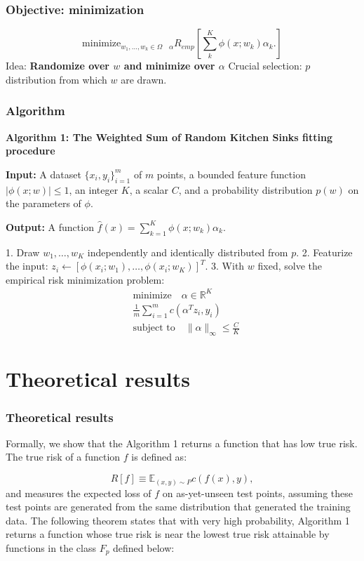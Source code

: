 \begin{frame}
  \frametitle{Objective: minimization}

  \begin{equation}
    \text{minimize}_{w_1, \ldots, w_k \in \Omega \quad \alpha}
    R_{emp}\left[
      \sum_k^K \phi(x; w_k) \alpha_k. 
    \right]
  \end{equation}
  Idea: \textbf{Randomize over $w$ and minimize over $\alpha$}
  Crucial selection: $p$ distribution from which $w$ are drawn.

\end{frame}

\begin{frame}
  \frametitle{Algorithm}
  \textbf{Algorithm 1: The Weighted Sum of Random Kitchen Sinks fitting procedure}

  \textbf{Input:}
  A dataset $\{x_i, y_i\}_{i=1}^m$ of $m$ points,
  a bounded feature function $|\phi(x; w)| \leq 1$,
  an integer $K$,
  a scalar $C$,
  and a probability distribution $p(w)$ on the parameters of $\phi$.
  
  \textbf{Output:}
  A function $\hat{f}(x) = \sum_{k=1}^K \phi(x; w_k)\alpha_k$.
  
  1. Draw $w_1, \ldots, w_K$ independently and identically distributed from $p$.
  2. Featurize the input: $z_i \leftarrow [\phi(x_i; w_1), \ldots, \phi(x_i; w_K)]^T$.
  3. With $w$ fixed, solve the empirical risk minimization problem:
  \[
  \begin{aligned}
  &\text{minimize} \quad \alpha \in \mathbb{R}^K \\
  &\frac{1}{m} \sum_{i=1}^m c(\alpha^T z_i, y_i) \\
  &\text{subject to} \quad \|\alpha\|_{\infty} \leq \frac{C}{K}
  \end{aligned}
  \]
  

\end{frame}

\section{Theoretical results}
\begin{frame}
  \frametitle{Theoretical results}
  Formally, we show that the Algorithm 1 returns a function that has low true risk. The true risk of a function $f$ is defined as:
  
  \begin{equation}
    R[f] \equiv \mathbb{E}_{(x,y)\sim P} c(f(x), y),
  \end{equation}
  and measures the expected loss of $f$ on as-yet-unseen test points, assuming these test points are generated from the same distribution that generated the training data. The following theorem states that with very high probability, Algorithm 1 returns a function whose true risk is near the lowest true risk attainable by functions in the class $F_p$ defined below:

\end{frame}

